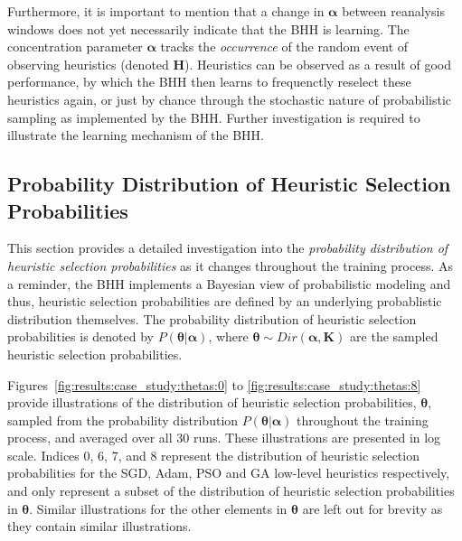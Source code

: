 Furthermore, it is important to mention that a change in $\boldsymbol{\alpha}$ between reanalysis windows does not yet necessarily indicate that the \acs{BHH} is learning. The concentration parameter $\boldsymbol{\alpha}$ tracks the \textit{occurrence} of the random event of observing heuristics (denoted $\boldsymbol{{H}}$). Heuristics can be observed as a result of good performance, by which the \acs{BHH} then learns to frequenctly reselect these heuristics again, or just by chance through the stochastic nature of probabilistic sampling as implemented by the \acs{BHH}. Further investigation is required to illustrate the learning mechanism of the \acs{BHH}.



\subsection{Probability Distribution of Heuristic Selection Probabilities}\label{sec:results:case_study:probs_of_select_probs}

This section provides a detailed investigation into the \textit{probability distribution of heuristic selection probabilities} as it changes throughout the training process. As a reminder, the \acs{BHH} implements a Bayesian view of probabilistic modeling and thus, heuristic selection probabilities are defined by an underlying probablistic distribution themselves. The probability distribution of heuristic selection probabilities is denoted by $P(\boldsymbol{\theta} \vert \boldsymbol{\alpha})$, where $\boldsymbol{\theta} \sim Dir(\boldsymbol{\alpha, K})$ are the sampled heuristic selection probabilities.

Figures~\ref{fig:results:case_study:thetas:0} to \ref{fig:results:case_study:thetas:8} provide illustrations of the distribution of heuristic selection probabilities, $\boldsymbol{\theta}$, sampled from the probability distribution $P(\boldsymbol{\theta} \vert \boldsymbol{\alpha})$ throughout the training process, and averaged over all 30 runs. These illustrations are presented in log scale. Indices 0, 6, 7, and 8 represent the distribution of heuristic selection probabilities for the \acs{SGD}, \acs{Adam}, \acs{PSO} and \acs{GA} low-level heuristics respectively, and only represent a subset of the distribution of heuristic selection probabilities in $\boldsymbol{\theta}$. Similar illustrations for the other elements in $\boldsymbol{\theta}$ are left out for brevity as they contain similar illustrations.

